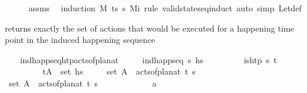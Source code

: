 \begin{isabellebody}
%
\isadelimproof
\ \ \ \ %
\endisadelimproof
%
\isatagproof
{}\isamarkupfalse%
\ assms\ \isamarkupfalse%
\ {\isacharparenleft}{\kern0pt}induction\ M\ ts\ {\isasympi}s\ M\isactrlsub i\ rule{\isacharcolon}{\kern0pt}\ valid{\isacharunderscore}{\kern0pt}state{\isacharunderscore}{\kern0pt}seq{\isachardot}{\kern0pt}induct{\isacharparenright}{\kern0pt}\ {\isacharparenleft}{\kern0pt}auto\ simp{\isacharcolon}{\kern0pt}\ Let{\isacharunderscore}{\kern0pt}def{\isacharparenright}{\kern0pt}%
\endisatagproof
{\isafoldproof}%
%
\isadelimproof
%
\endisadelimproof
%
\begin{isamarkuptext}%
 returns exactly the set of actions that would be executed 
  for a happening time point in the induced happening sequence%
\end{isamarkuptext}\isamarkuptrue%
\ \ \isamarkupfalse%
\ ind{\isacharunderscore}{\kern0pt}happ{\isacharunderscore}{\kern0pt}seq{\isacharunderscore}{\kern0pt}htp{\isacharunderscore}{\kern0pt}acts{\isacharunderscore}{\kern0pt}of{\isacharunderscore}{\kern0pt}plan{\isacharunderscore}{\kern0pt}at{\isacharcolon}{\kern0pt}\isanewline
\ \ \ \ \ {\isachardoublequoteopen}ind{\isacharunderscore}{\kern0pt}happ{\isacharunderscore}{\kern0pt}seq\ {\isasympi}s\ hs{\isachardoublequoteclose}\isanewline
\ \ \ \ \ \ \ \ \ {\isachardoublequoteopen}is{\isacharunderscore}{\kern0pt}htp\ {\isasympi}s\ t{\isachardoublequoteclose}\isanewline
\ \ \ \ \ \ \ \ \ {\isachardoublequoteopen}{\isacharparenleft}{\kern0pt}t{\isacharcomma}{\kern0pt}A{\isacharparenright}{\kern0pt}\ {\isasymin}\ set\ hs{\isachardoublequoteclose}\isanewline
\ \ \ \ \ {\isachardoublequoteopen}set\ A\ {\isacharequal}{\kern0pt}\ acts{\isacharunderscore}{\kern0pt}of{\isacharunderscore}{\kern0pt}plan{\isacharunderscore}{\kern0pt}at\ t\ {\isasympi}s{\isachardoublequoteclose}\isanewline
%
\isadelimproof
\ \ %
\endisadelimproof
%
\isatagproof
{}\isamarkupfalse%
\isanewline
\ \ \ \ \isamarkupfalse%
\ {\isachardoublequoteopen}set\ A\ {\isasymsubseteq}\ acts{\isacharunderscore}{\kern0pt}of{\isacharunderscore}{\kern0pt}plan{\isacharunderscore}{\kern0pt}at\ t\ {\isasympi}s{\isachardoublequoteclose}\isanewline
\ \ \ \ \isamarkupfalse%
\isanewline
\ \ \ \ \ \ \isamarkupfalse%
\ a\isanewline
\ \ \ \ \ \ \isamarkupfalse%

\end{isabellebody}
